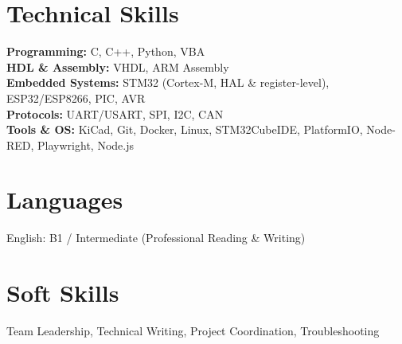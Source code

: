 \documentclass[10.5pt,a4paper]{article}
\begin{document}
\section*{Technical Skills}

\textbf{Programming:} C, C++, Python, VBA\\
\textbf{HDL \& Assembly:} VHDL, ARM Assembly\\
\textbf{Embedded Systems:} STM32 (Cortex-M, HAL \& register-level), ESP32/ESP8266, PIC, AVR\\
\textbf{Protocols:} UART/USART, SPI, I2C, CAN\\
\textbf{Tools \& OS:} KiCad, Git, Docker, Linux, STM32CubeIDE, PlatformIO, Node-RED, Playwright, Node.js\\

\section*{Languages}
English: B1 / Intermediate (Professional Reading \& Writing)

\section*{Soft Skills}
Team Leadership, Technical Writing, Project Coordination, Troubleshooting
\end{document}
